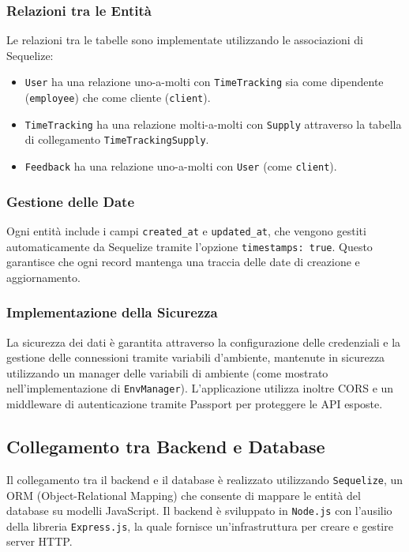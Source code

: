 \documentclass[twoside]{supsistudent}
\begin{document}
\subsubsection{Relazioni tra le Entità}
Le relazioni tra le tabelle sono implementate utilizzando le associazioni di Sequelize:
\begin{itemize}
  \item \texttt{User} ha una relazione uno-a-molti con \texttt{TimeTracking} sia come dipendente (\texttt{employee}) che come cliente (\texttt{client}).
  \item \texttt{TimeTracking} ha una relazione molti-a-molti con \texttt{Supply} attraverso la tabella di collegamento \texttt{TimeTrackingSupply}.
  \item \texttt{Feedback} ha una relazione uno-a-molti con \texttt{User} (come \texttt{client}).
\end{itemize}

\subsubsection{Gestione delle Date}
Ogni entità include i campi \texttt{created\_at} e \texttt{updated\_at}, che vengono gestiti automaticamente da Sequelize tramite l'opzione \texttt{timestamps: true}. Questo garantisce che ogni record mantenga una traccia delle date di creazione e aggiornamento.

\subsubsection{Implementazione della Sicurezza}
La sicurezza dei dati è garantita attraverso la configurazione delle credenziali e la gestione delle connessioni tramite variabili d'ambiente, mantenute in sicurezza utilizzando un manager delle variabili di ambiente (come mostrato nell'implementazione di \texttt{EnvManager}). L'applicazione utilizza inoltre CORS e un middleware di autenticazione tramite Passport per proteggere le API esposte.

\subsection{Collegamento tra Backend e Database}
Il collegamento tra il backend e il database è realizzato utilizzando \texttt{Sequelize}, un ORM (Object-Relational Mapping) che consente di mappare le entità del database su modelli JavaScript. Il backend è sviluppato in \texttt{Node.js} con l'ausilio della libreria \texttt{Express.js}, la quale fornisce un'infrastruttura per creare e gestire server HTTP.
\end{document}
